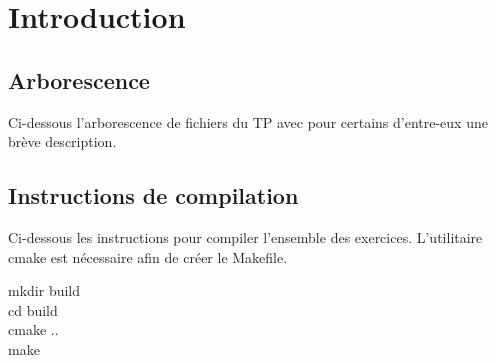 \section{Introduction}

\subsection{Arborescence}
\noindent Ci-dessous l'arborescence de fichiers du TP avec pour certains d'entre-eux une brève description.


\subsection{Instructions de compilation}
Ci-dessous les instructions pour compiler l'ensemble des exercices. L'utilitaire cmake \cite{cite:cmake} est nécessaire afin de créer le Makefile.

\begin{mdframed}[backgroundcolor=lightblue, linecolor=darkblue]
	mkdir build\\
	cd build\\
	cmake ..\\
	make
\end{mdframed}
